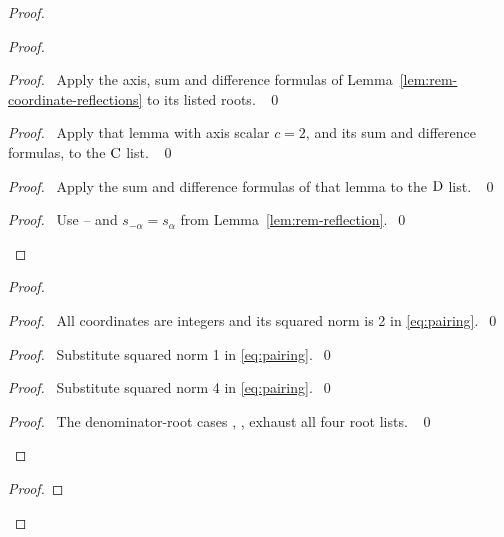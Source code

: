 \begin{proof}
\begin{proof}
\begin{proof}\pf\ Apply the axis, sum and difference formulas of
Lemma~\ref{lem:rem-coordinate-reflections} to its listed roots. ~\qed\end{proof}
\begin{proof}\pf\ Apply that lemma with axis scalar $c=2$, and its sum
and difference formulas, to the $\mathrm{C}$ list. ~\qed\end{proof}
\begin{proof}\pf\ Apply the sum and difference formulas of that lemma
to the $\mathrm{D}$ list. ~\qed\end{proof}
\qedstep
\begin{proof}\pf\ Use -- and
$s_{-\alpha}=s_\alpha$ from Lemma~\ref{lem:rem-reflection}.~\qed\end{proof}
\end{proof}
\begin{proof}
\begin{proof}\pf\ All coordinates are integers and its squared norm is
2 in \eqref{eq:pairing}.~\qed\end{proof}
\begin{proof}\pf\ Substitute squared norm 1 in \eqref{eq:pairing}.~\qed\end{proof}
\begin{proof}\pf\ Substitute squared norm 4 in \eqref{eq:pairing}.~\qed\end{proof}
\qedstep
\begin{proof}\pf\ The denominator-root cases
, , 
exhaust all four root lists. ~\qed\end{proof}
\end{proof}
\begin{proof}

\end{proof}
\end{proof}
